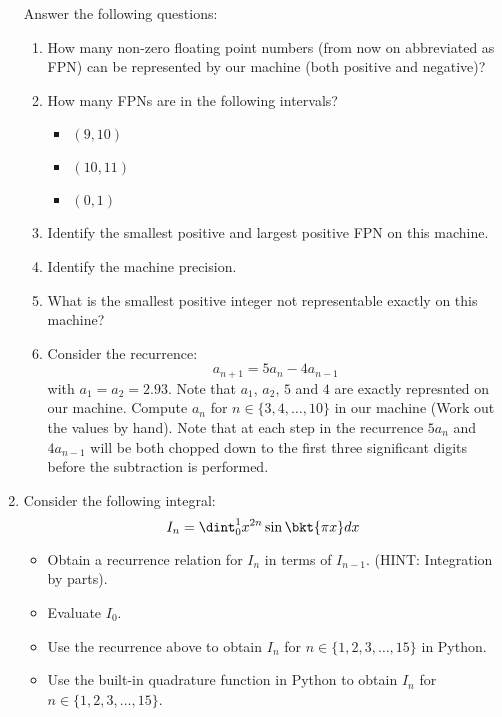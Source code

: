 \documentclass{article}
\begin{document}
\begin{enumerate}
		\begin{center}
		\end{center}
		Answer the following questions:
		\begin{enumerate}
			\item
			How many non-zero floating point numbers (from now on abbreviated as FPN) can be represented by our machine (both positive and negative)?
			\item
			How many FPNs are in the following intervals?
			\begin{itemize}
				\item
				$(9,10)$
				\item
				$(10,11)$
				\item
				$(0,1)$
			\end{itemize}
			\item
			Identify the smallest positive and largest positive FPN on this machine.
			\item
			Identify the machine precision.
			\item
			What is the smallest positive integer not representable exactly on this machine?
			\item
			Consider the recurrence:
			$$a_{n+1}=5a_n-4a_{n-1}$$
			with $a_1=a_2=2.93$. Note that $a_1$, $a_2$, $5$ and $4$ are exactly represnted on our machine. Compute $a_n$ for $n \in \{3,4,\ldots,10\}$ in our machine (Work out the values by hand). Note that at each step in the recurrence $5a_n$ and $4a_{n-1}$ will be both chopped down to the first three significant digits before the subtraction is performed.
		\end{enumerate}
		\item
		Consider the following integral:
		$$I_n = \dint_0^1 x^{2n} \sin\bkt{\pi x} dx$$
		\begin{itemize}
			\item
			Obtain a recurrence relation for $I_n$ in terms of $I_{n-1}$. (HINT: Integration by parts).
			\item
			Evaluate $I_0$.
			\item
			Use the recurrence above to obtain $I_n$ for $n \in \{1,2,3,\ldots,15\}$ in Python.
			\item
			Use the built-in quadrature function in Python to obtain $I_n$ for $n \in \{1,2,3,\ldots,15\}$.

\end{itemize}
\end{enumerate}
\end{document}
